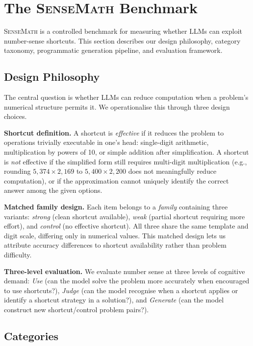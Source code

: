 \section{The \textsc{SenseMath} Benchmark}
\label{sec:benchmark}

\textsc{SenseMath} is a controlled benchmark for measuring whether LLMs can exploit number-sense shortcuts. This section describes our design philosophy, category taxonomy, programmatic generation pipeline, and evaluation framework.

\subsection{Design Philosophy}
\label{sec:design}

The central question is whether LLMs can reduce computation when a problem's numerical structure permits it. We operationalise this through three design choices.

\textbf{Shortcut definition.}
A shortcut is \emph{effective} if it reduces the problem to operations trivially executable in one's head: single-digit arithmetic, multiplication by powers of 10, or simple addition after simplification.
A shortcut is \emph{not} effective if the simplified form still requires multi-digit multiplication (e.g., rounding $5{,}374 \times 2{,}169$ to $5{,}400 \times 2{,}200$ does not meaningfully reduce computation), or if the approximation cannot uniquely identify the correct answer among the given options.

\textbf{Matched family design.}
Each item belongs to a \emph{family} containing three variants: \emph{strong} (clean shortcut available), \emph{weak} (partial shortcut requiring more effort), and \emph{control} (no effective shortcut). All three share the same template and digit scale, differing only in numerical values. This matched design lets us attribute accuracy differences to shortcut availability rather than problem difficulty.

\textbf{Three-level evaluation.}
We evaluate number sense at three levels of cognitive demand:
\emph{Use} (can the model solve the problem more accurately when encouraged to use shortcuts?),
\emph{Judge} (can the model recognise when a shortcut applies or identify a shortcut strategy in a solution?), and
\emph{Generate} (can the model construct new shortcut/control problem pairs?).

\subsection{Categories}
\label{sec:categories}

